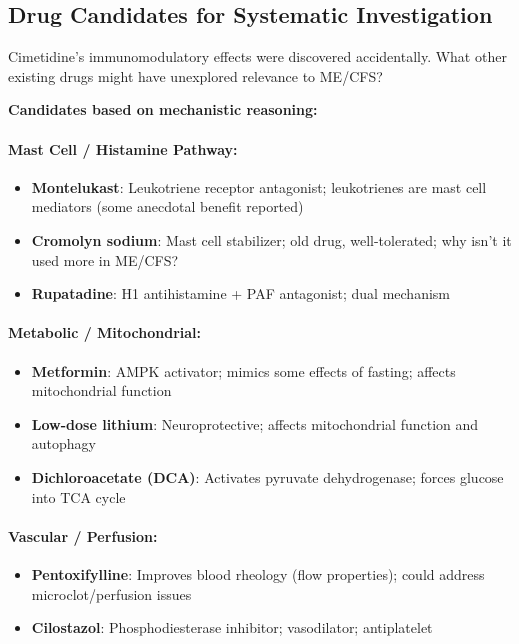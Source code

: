 \subsection{Drug Candidates for Systematic Investigation}
\label{sec:drug-candidates}

\begin{open_question}
\label{oq:drug-candidates}
Cimetidine's immunomodulatory effects were discovered accidentally. What other existing drugs might have unexplored relevance to ME/CFS?

\textbf{Candidates based on mechanistic reasoning:}

\paragraph{Mast Cell / Histamine Pathway:}
\begin{itemize}
    \item \textbf{Montelukast}: Leukotriene receptor antagonist; leukotrienes are mast cell mediators (some anecdotal benefit reported)
    \item \textbf{Cromolyn sodium}: Mast cell stabilizer; old drug, well-tolerated; why isn't it used more in ME/CFS?
    \item \textbf{Rupatadine}: H1 antihistamine + PAF antagonist; dual mechanism
\end{itemize}

\paragraph{Metabolic / Mitochondrial:}
\begin{itemize}
    \item \textbf{Metformin}: AMPK activator; mimics some effects of fasting; affects mitochondrial function
    \item \textbf{Low-dose lithium}: Neuroprotective; affects mitochondrial function and autophagy
    \item \textbf{Dichloroacetate (DCA)}: Activates pyruvate dehydrogenase; forces glucose into TCA cycle
\end{itemize}

\paragraph{Vascular / Perfusion:}
\begin{itemize}
    \item \textbf{Pentoxifylline}: Improves blood rheology (flow properties); could address microclot/perfusion issues
    \item \textbf{Cilostazol}: Phosphodiesterase inhibitor; vasodilator; antiplatelet
\end{itemize}


\end{open_question}
